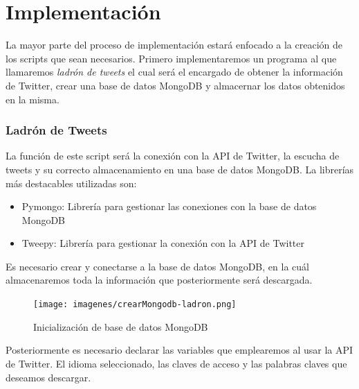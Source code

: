 
\chapter{Implementación}

La mayor parte del proceso de implementación estará enfocado a la creación de los scripts que sean necesarios. Primero implementaremos un programa al que llamaremos \textit{ladrón de tweets} el cual será el encargado de obtener la información de Twitter, crear una base de datos MongoDB y almacernar los datos obtenidos en la misma. 


\subsection{Ladrón de Tweets}

La función de este script será la conexión con la API de Twitter, la escucha de tweets y su correcto almacenamiento en una base de datos MongoDB. La librerías más destacables utilizadas son: 
\begin{itemize}
	\item Pymongo\cite{Pymongo}: Librería para gestionar las conexiones con la base de datos MongoDB
	\item Tweepy\cite{Tweepy}: Librería para gestionar la conexión con la API de Twitter
\end{itemize}



Es necesario crear y conectarse a la base de datos MongoDB, en la cuál almacenaremos toda la información que posteriormente será descargada. 

\begin{figure}[h]
	\centering
	\texttt{[image: imagenes/crearMongodb-ladron.png]}
	\caption{Inicialización de base de datos MongoDB}
	\label{fig:crear-mongodb}
\end{figure}


Posteriormente es necesario declarar las variables que emplearemos al usar la API de Twitter. El idioma seleccionado, las claves de acceso y las palabras claves que deseamos descargar. 



